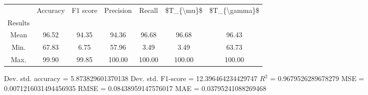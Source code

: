 \begin{tabular}{|c|c|c|c|c|c|c|}
\toprule
{} &  Accuracy &  F1 score &  Precision &  Recall &  \$T\_\{\textbackslash mu\}\$ &  \$T\_\{\textbackslash gamma\}\$ \\
Results &           &           &            &         &            &               \\
\hline
Mean    &     96.52 &     94.35 &      94.36 &   96.68 &      96.68 &         96.43 \\
Min.    &     67.83 &      6.75 &      57.96 &    3.49 &       3.49 &         63.73 \\
Max.    &     99.90 &     99.85 &     100.00 &  100.00 &     100.00 &        100.00 \\
\bottomrule
\end{tabular}

 Dev. std. accuracy = 5.873829601370138
 Dev. std. F1-score = 12.396464234429747
 $R^2$ = 0.9679526289678279
 MSE = 0.0071216031494456935
 RMSE = 0.08438959147576017
 MAE = 0.03795241088269468